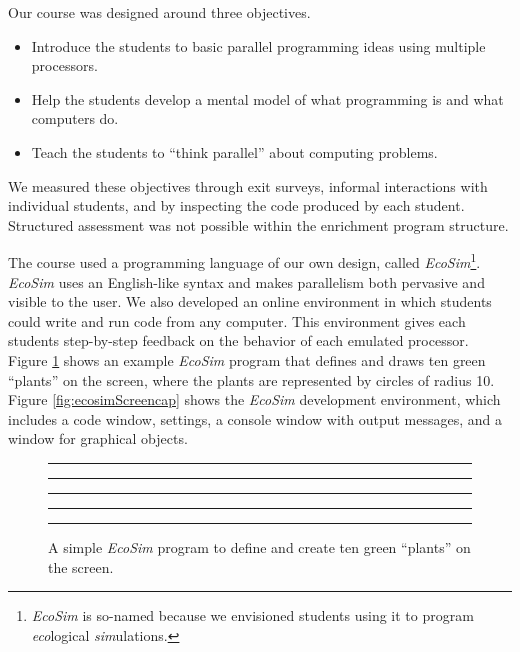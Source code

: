 \documentclass{sig-alternate}
\newcommand{\INDSTATE}[1][1]{\STATE\hspace{#1\algorithmicindent}}
\newcommand{\EcoSim}{\emph{EcoSim}}
\begin{document}
Our course was designed around three objectives.
\begin{itemize}\itemsep=0pt\parskip=0pt
\item Introduce the students to basic parallel programming ideas using multiple processors.
\item Help the students develop a mental model of what programming is and what computers do.
\item Teach the students to ``think parallel'' about computing problems.
\end{itemize}
We measured these objectives through exit surveys, 
informal interactions with individual students, 
and by inspecting the code produced by each student.
Structured assessment was not possible within the enrichment program structure.

The course used a programming language of our own design, called \EcoSim{}\footnote{
\EcoSim{} is so-named because we envisioned students using it to program \emph{eco}logical \emph{sim}ulations.}.
\EcoSim{} uses an English-like syntax and makes parallelism both pervasive and visible to the user.
We also developed an online environment in which students could write and run code from any computer.
This environment gives each students step-by-step feedback on the behavior of each emulated processor.
Figure \ref{fig:exampleProgram} shows an example \emph{EcoSim} program that defines and
draws ten green ``plants'' on the screen, where the plants are represented by circles of radius 10.
Figure \ref{fig:ecosimScreencap} shows the \emph{EcoSim} development environment, which includes
a code window, settings, a console window with output messages, and a window for graphical objects.
\begin{figure}
\hrule\hrule\vspace{0.2em}
\begin{algorithmic}[1]\ttfamily\lsstyle
  \INDSTATE{a position}
  \INDSTATE{size, a number}
  \INDSTATE{a color}
\STATE{}
  \INDSTATE{do in order}
  \INDSTATE[2]{replace the plant's color with green}
  \INDSTATE[2]{replace the plant's size with 10}
\end{algorithmic} 
\hrule\vspace{-0.8em}
\caption{A simple \emph{EcoSim} program to define and create ten green ``plants'' on the screen.}
\vspace*{0.2em}\hrule\hrule
\label{fig:exampleProgram} 
\end{figure}
\end{document}
